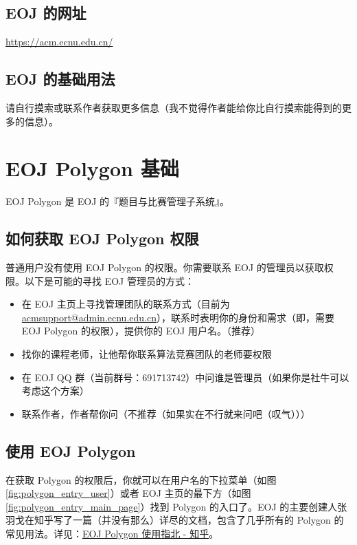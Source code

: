 \documentclass[oneside]{book}
\begin{document}
\subsection{EOJ 的网址}

\href{https://acm.ecnu.edu.cn/}{https://acm.ecnu.edu.cn/}

\subsection{EOJ 的基础用法}


请自行摸索或联系作者获取更多信息（我不觉得作者能给你比自行摸索能得到的更多的信息）。

\section{EOJ Polygon 基础}

EOJ Polygon 是 EOJ 的『题目与比赛管理子系统』。

\subsection{如何获取 EOJ Polygon 权限}

\label{ssec:eoj_polygon_permission}

普通用户没有使用 EOJ Polygon 的权限。你需要联系 EOJ 的管理员以获取权限。以下是可能的寻找 EOJ 管理员的方式：

\begin{itemize}
    \item 在 EOJ 主页上寻找管理团队的联系方式（目前为 \href{mailto:acmsupport@admin.ecnu.edu.cn}{acmsupport@admin.ecnu.edu.cn}），联系时表明你的身份和需求（即，需要 EOJ Polygon 的权限），提供你的 EOJ 用户名。（推荐）
    \item 找你的课程老师，让他帮你联系算法竞赛团队的老师要权限
    \item 在 EOJ QQ 群（当前群号：691713742）中问谁是管理员（如果你是社牛可以考虑这个方案）
    \item 联系作者，作者帮你问（不推荐（如果实在不行就来问吧（叹气）））
\end{itemize}

\subsection{使用 EOJ Polygon}

在获取 Polygon 的权限后，你就可以在用户名的下拉菜单（如图 \ref{fig:polygon_entry_user}）或者 EOJ 主页的最下方（如图 \ref{fig:polygon_entry_main_page}）找到 Polygon 的入口了。EOJ 的主要创建人张羽戈在知乎写了一篇（并没有那么）详尽的文档，包含了几乎所有的 Polygon 的常见用法。详见：\href{https://zhuanlan.zhihu.com/p/59869879}{EOJ Polygon 使用指北 - 知乎}。
\end{document}
